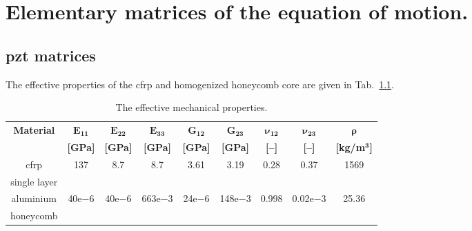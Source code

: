 
\chapter{Elementary matrices of the equation of motion.}
\label{app:matrices}

\section{\ac{pzt} matrices}
The effective properties of the \ac{cfrp} and homogenized honeycomb core are given in Tab.~\ref{tab:properties_eff}.
\vspace{-12pt}
\begin{table}[H]
	\small
	
	\tabcolsep=0.25cm
	\caption{\label{tab:properties_eff} The effective mechanical properties.}
	\begin{tabular}{ccccccccc}
		\toprule
		\multirow{2}{*}{\textbf{Material}} & $\boldsymbol{E_{11}}$ & $\boldsymbol{E_{22}}$ & $\boldsymbol{E_{33}}$ & $\boldsymbol{G_{12}}$ & $\boldsymbol{G_{23}}$ & $\boldsymbol{\nu_{12}}$	& $\boldsymbol{\nu_{23}}$ & $\boldsymbol{\rho}$ \\
		& \textbf{[GPa]} & \textbf{[GPa]} & \textbf{[GPa]} & \textbf{[GPa]} & \textbf{[GPa]} & \textbf{[--]} & \textbf{[--]} & \textbf{[kg/m}$\boldsymbol{^3}$\textbf{]}\\
		\midrule
		\ac{cfrp} & 137 & 8.7 & 8.7 & 3.61 & 3.19 & 0.28 & 0.37 & 1569\\
		single layer & & & & & & & &\\ \midrule
		aluminium & 40e{$-$6} & 40e{$-$6} & 663e{$-$3} & 24e{$-$6} & 148e{$-$3} & 0.998 & 0.02e{$-$3} & 25.36\\
		honeycomb & & & & & & & &\\
		\bottomrule
	\end{tabular}
\end{table}
